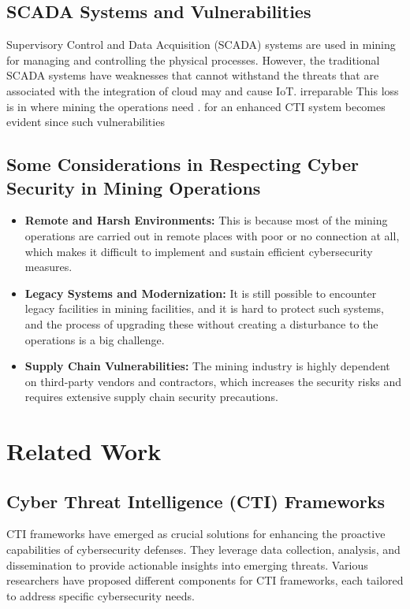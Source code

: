 \documentclass[a4paper,twoside,12pt]{report}
\begin{document}
\subsection{SCADA Systems and Vulnerabilities} 
Supervisory Control and  Data Acquisition (SCADA) systems are used in mining for managing and controlling the physical processes.  However, the traditional SCADA systems have weaknesses that cannot withstand the threats that are associated with the integration of  cloud may and cause IoT. irreparable This loss is in where mining the operations need \citep{wang2013cyber}. for 
an 
enhanced  CTI system becomes evident since such vulnerabilities  \subsection{Some Considerations in Respecting Cyber Security in Mining Operations} 
 \begin{itemize} 
\item \textbf{Remote and Harsh Environments:} This is because most  of the mining operations are carried out in remote places with poor or no connection at all, which makes  it difficult to implement and sustain efficient cybersecurity measures. 
\item \textbf{Legacy Systems and  Modernization:} It is still possible to encounter legacy facilities in mining facilities, and it is hard  to protect such systems, and the process of upgrading these without creating a disturbance to the operations is a  big challenge. 
\item \textbf{Supply Chain Vulnerabilities:} The mining industry is  highly dependent on third-party vendors and contractors, which increases the security risks and requires extensive supply chain security  precautions. 
\end{itemize}

\section{Related Work}
\subsection{Cyber Threat Intelligence (CTI) Frameworks}
CTI frameworks have emerged as crucial solutions for enhancing the proactive capabilities of cybersecurity defenses. They leverage data collection, analysis, and dissemination to provide actionable insights into emerging threats. Various researchers have proposed different components for CTI frameworks, each tailored to address specific cybersecurity needs.
\end{document}
